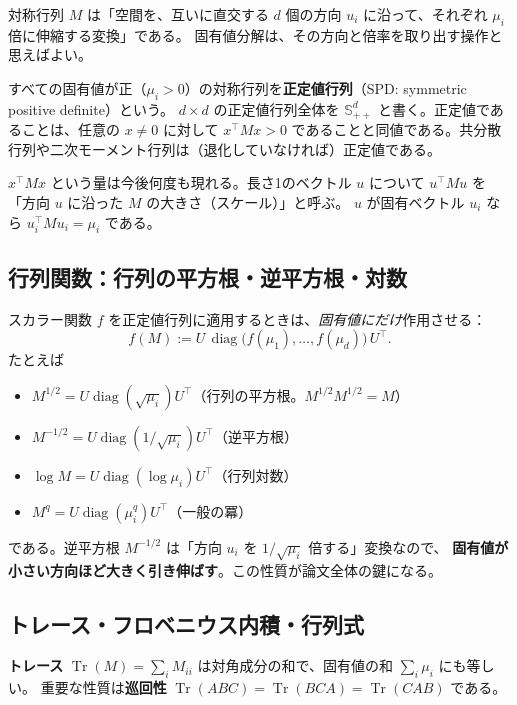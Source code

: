 \documentclass[a4paper,11pt]{ltjsarticle}
\theoremstyle{definition}
\theoremstyle{plain}
\newcommand{\Spd}[1]{\mathbb{S}^{#1}_{++}}
\DeclareMathOperator{\Tr}{Tr}
\DeclareMathOperator{\diag}{diag}
\newcommand{\T}{^{\top}}
\begin{document}
\begin{intuitionbox}
対称行列 $M$ は「空間を、互いに直交する $d$ 個の方向 $u_i$ に沿って、それぞれ $\mu_i$ 倍に伸縮する変換」である。
固有値分解は、その方向と倍率を取り出す操作と思えばよい。
\end{intuitionbox}

すべての固有値が正（$\mu_i>0$）の対称行列を\textbf{正定値行列}（SPD: symmetric positive definite）という。
$d\times d$ の正定値行列全体を $\Spd{d}$ と書く。正定値であることは、任意の $x\neq 0$ に対して
$x\T M x > 0$ であることと同値である。共分散行列や二次モーメント行列は（退化していなければ）正定値である。

$x\T M x$ という量は今後何度も現れる。長さ1のベクトル $u$ について $u\T M u$ を「方向 $u$ に沿った $M$ の大きさ（スケール）」と呼ぶ。
$u$ が固有ベクトル $u_i$ なら $u_i\T M u_i = \mu_i$ である。

\subsection{行列関数：行列の平方根・逆平方根・対数}

スカラー関数 $f$ を正定値行列に適用するときは、\emph{固有値にだけ}作用させる：
\begin{equation}
  f(M) := U\,\diag\bigl(f(\mu_1),\dots,f(\mu_d)\bigr)\,U\T.
\end{equation}
たとえば
\begin{itemize}
  \item $M^{1/2} = U\diag(\sqrt{\mu_i})U\T$（行列の平方根。$M^{1/2}M^{1/2}=M$）
  \item $M^{-1/2} = U\diag(1/\sqrt{\mu_i})U\T$（逆平方根）
  \item $\log M = U\diag(\log\mu_i)U\T$（行列対数）
  \item $M^q = U\diag(\mu_i^q)U\T$（一般の冪）
\end{itemize}
である。逆平方根 $M^{-1/2}$ は「方向 $u_i$ を $1/\sqrt{\mu_i}$ 倍する」変換なので、
\textbf{固有値が小さい方向ほど大きく引き伸ばす}。この性質が論文全体の鍵になる。

\subsection{トレース・フロベニウス内積・行列式}

\textbf{トレース} $\Tr(M) = \sum_i M_{ii}$ は対角成分の和で、固有値の和 $\sum_i\mu_i$ にも等しい。
重要な性質は\textbf{巡回性} $\Tr(ABC) = \Tr(BCA) = \Tr(CAB)$ である。
\end{document}
